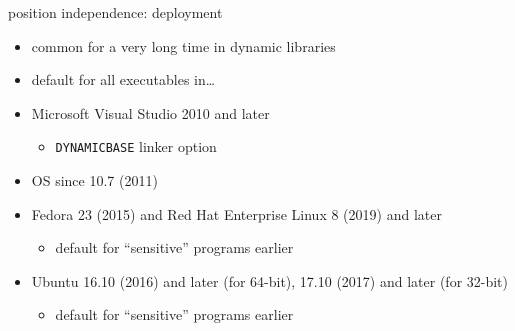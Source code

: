 \begin{frame}{position independence: deployment}
\begin{itemize}
    \item common for a very long time in dynamic libraries
    \item default for all executables in\ldots
    \vspace{.5cm}
    \item Microsoft Visual Studio 2010 and later
        \begin{itemize}
        \item \texttt{DYNAMICBASE} linker option
        \end{itemize}
    \item OS since 10.7 (2011)
    \item Fedora 23 (2015) and Red Hat Enterprise Linux 8 (2019) and later
        \begin{itemize}
        \item default for ``sensitive'' programs earlier
        \end{itemize}
    \item Ubuntu 16.10 (2016) and later (for 64-bit), 17.10 (2017) and later (for 32-bit)
        \begin{itemize}
        \item default for ``sensitive'' programs earlier
        \end{itemize}
\end{itemize}
\end{frame}

